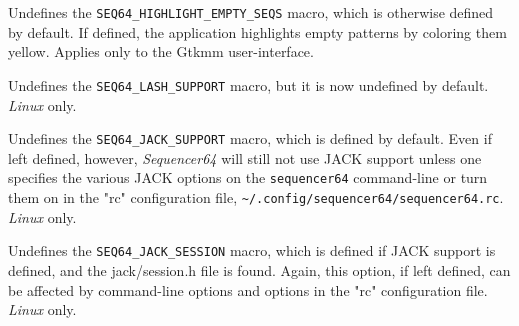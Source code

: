         Undefines the \texttt{SEQ64\_HIGHLIGHT\_EMPTY\_SEQS}
        macro, which is otherwise defined by default.  If defined, the
        application highlights empty patterns by coloring them yellow.
        Applies only to the Gtkmm user-interface.

        Undefines the \texttt{SEQ64\_LASH\_SUPPORT} macro, but it
        is now undefined by default.
        \textsl{Linux} only.

        Undefines the \texttt{SEQ64\_JACK\_SUPPORT} macro, which is
        defined by default.  Even if left defined,
        however, \textsl{Sequencer64} will still not use JACK support unless
        one specifies the various JACK options on the \texttt{sequencer64}
        command-line or turn them on in the "rc" configuration file,
        \texttt{\textasciitilde/.config/sequencer64/sequencer64.rc}.
        \textsl{Linux} only.

        Undefines the \texttt{SEQ64\_JACK\_SESSION} macro, which is
        defined if JACK support is defined, and the jack/session.h file is
        found.  Again, this option, if left defined, can be affected by
        command-line options and options in the "rc" configuration file.
        \textsl{Linux} only.


